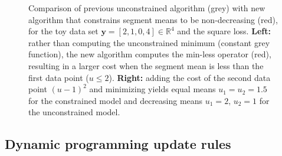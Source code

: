 \documentclass{article}
\newtheorem{lemma}{Lemma}
\newcommand{\RR}{\mathbb R}
\begin{document}
\begin{figure}[b!]
  \centering
  
  
  \vskip -0.5cm
  \caption{Comparison of previous unconstrained algorithm (grey) with
    new algorithm that constrains segment means to be non-decreasing (red),
    for the toy data set $\mathbf y= [ 2, 1, 0, 4 ] \in\RR^4$ and the
    square loss. \textbf{Left:} rather than computing the
    unconstrained minimum (constant grey function), the new algorithm
    computes the min-less operator (red), resulting in a larger cost
    when the segment mean is less than the first data point
    ($u\leq 2$). \textbf{Right:} adding the cost of the second data
    point $(u-1)^2$ and minimizing yields equal means
    $u_1=u_2=1.5$ for the constrained model and decreasing 
    means $u_1=2,\, u_2=1$ for the unconstrained model.}
  \label{fig:compare-unconstrained}
\end{figure}




\subsection{Dynamic programming update rules}
\end{document}
